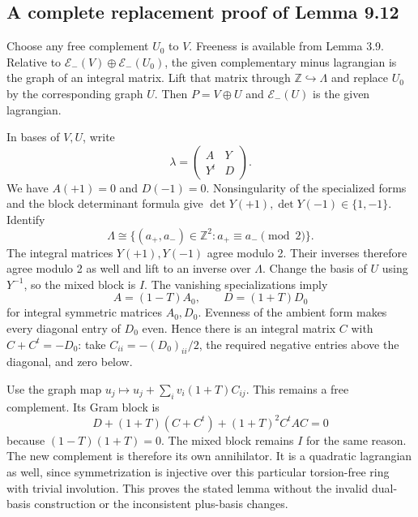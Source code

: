 \documentclass[10pt]{article}
\begin{document}
\subsection*{A complete replacement proof of Lemma 9.12}
Choose any free complement \(U_0\) to \(V\). Freeness is available from Lemma 3.9. Relative to \(\mathcal E_-(V)\oplus\mathcal E_-(U_0)\), the given complementary minus lagrangian is the graph of an integral matrix. Lift that matrix through \(\mathbb Z\hookrightarrow\Lambda\) and replace \(U_0\) by the corresponding graph \(U\). Then \(P=V\oplus U\) and \(\mathcal E_-(U)\) is the given lagrangian.\par
In bases of \(V,U\), write \[\lambda=\begin{pmatrix}A&Y\\Y^t&D\end{pmatrix}.\] We have \(A(+1)=0\) and \(D(-1)=0\). Nonsingularity of the specialized forms and the block determinant formula give \(\det Y(+1),\det Y(-1)\in\{1,-1\}\). Identify \[\Lambda\cong\{(a_+,a_-)\in\mathbb Z^2:a_+\equiv a_-\pmod2\}.\] The integral matrices \(Y(+1),Y(-1)\) agree modulo 2. Their inverses therefore agree modulo 2 as well and lift to an inverse over \(\Lambda\). Change the basis of \(U\) using \(Y^{-1}\), so the mixed block is \(I\). The vanishing specializations imply \[A=(1-T)A_0,\qquad D=(1+T)D_0\] for integral symmetric matrices \(A_0,D_0\). Evenness of the ambient form makes every diagonal entry of \(D_0\) even. Hence there is an integral matrix \(C\) with \(C+C^t=-D_0\): take \(C_{ii}=-(D_0)_{ii}/2\), the required negative entries above the diagonal, and zero below.\par
Use the graph map \(u_j\mapsto u_j+\sum_i v_i(1+T)C_{ij}\). This remains a free complement. Its Gram block is \[D+(1+T)(C+C^t)+(1+T)^2C^tAC=0\] because \((1-T)(1+T)=0\). The mixed block remains \(I\) for the same reason. The new complement is therefore its own annihilator. It is a quadratic lagrangian as well, since symmetrization is injective over this particular torsion-free ring with trivial involution. This proves the stated lemma without the invalid dual-basis construction or the inconsistent plus-basis changes.\par
\end{document}
